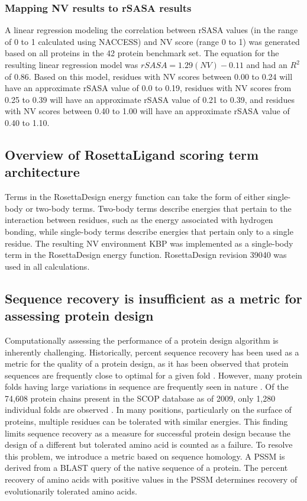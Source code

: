 \subsubsection{Mapping \acs{NV} results to \acs{rSASA} results} 
A linear regression modeling the correlation between \ac{rSASA} values (in the range of 0 to 1 calculated using NACCESS) and \ac{NV} score (range 0 to 1) was generated based on all proteins in the 42 protein benchmark set.
The equation for the resulting linear regression model was $rSASA = 1.29(NV)-0.11$ and had an $R^{2}$ of 0.86.
Based on this model, residues with \ac{NV} scores between 0.00 to 0.24 will have an approximate \ac{rSASA} value of 0.0 to 0.19, residues with \ac{NV} scores from 0.25 to 0.39 will have an approximate \ac{rSASA} value of 0.21 to 0.39, and residues with \ac{NV} scores between 0.40 to 1.00 will have an approximate \ac{rSASA} value of 0.40 to 1.10.

\subsection{Overview of RosettaLigand scoring term architecture}
Terms in the RosettaDesign energy function can take the form of either single-body or two-body terms.
Two-body terms describe energies that pertain to the interaction between residues, such as the energy associated with hydrogen bonding, while single-body terms describe energies that pertain only to a single residue.
The resulting \ac{NV} environment \ac{KBP} was implemented as a single-body term in the RosettaDesign energy function.
RosettaDesign revision 39040 was used in all calculations.  

\subsection{Sequence recovery is insufficient as a metric for assessing protein design}
Computationally assessing the performance of a protein design algorithm is inherently challenging.
Historically, percent sequence recovery has been used as a metric for the quality of a protein design, as it has been observed that protein sequences are frequently close to optimal for a given fold \citep{Kuhlman:2000tc}.
However, many protein folds having large variations in sequence are frequently seen in nature \citep{Chothia:1986tm}.
Of the 74,608 protein chains present in the \ac{SCOP} database as of 2009, only 1,280 individual folds are observed \citep{Schaeffer:2011fe}.
In many positions, particularly on the surface of proteins, multiple residues can be tolerated with similar energies.
This finding limits sequence recovery as a measure for successful protein design because the design of a different but tolerated amino acid is counted as a failure.
To resolve this problem, we introduce a metric based on sequence homology. A \ac{PSSM} is derived from a \ac{BLAST} query of the native sequence of a protein.
The percent recovery of amino acids with positive values in the \ac{PSSM} determines recovery of evolutionarily tolerated amino acids. 

